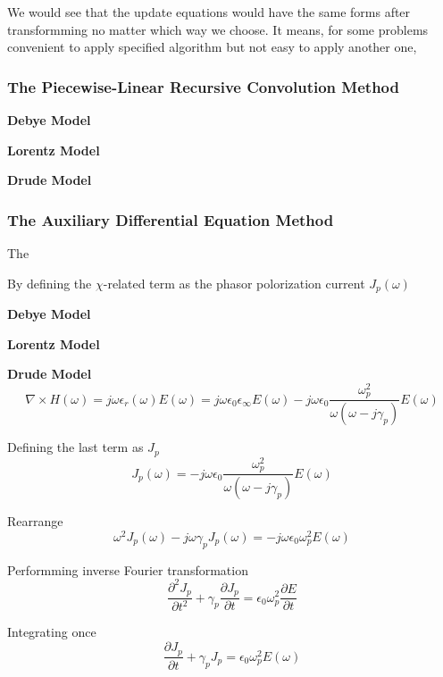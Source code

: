 We would see that the update equations would have the same forms after transformming no matter which way we choose. It
means, for some problems convenient to apply specified algorithm but not easy to apply another one, 

\subsubsection{The Piecewise-Linear Recursive Convolution Method}
\textbf{Debye Model}

\textbf{Lorentz Model}

\textbf{Drude Model}

\subsubsection{The Auxiliary Differential Equation Method}
The 

By defining the $\chi$-related term as the phasor polorization current $J_p(\omega)$

\textbf{Debye Model}

\textbf{Lorentz Model}

\textbf{Drude Model}
\begin{displaymath}
    \nabla \times H(\omega) = j\omega \epsilon_r(\omega)E(\omega) = j\omega\epsilon_0 \epsilon_{\infty} E(\omega) - j\omega\epsilon_0\frac{\omega_p^2}{\omega(\omega-j\gamma_p)}E(\omega)
\end{displaymath}

Defining the last term as $J_p$
\begin{displaymath}
  J_p(\omega) = -j\omega\epsilon_0\frac{\omega_p^2}{\omega(\omega-j\gamma_p)}E(\omega)
\end{displaymath}

Rearrange
\begin{displaymath}
  \omega^2J_p(\omega) - j\omega\gamma_pJ_p(\omega) = -j\omega\epsilon_0\omega_p^2 E(\omega)
\end{displaymath}

Performming inverse Fourier transformation
\begin{displaymath}
  \frac{\partial^2 J_p}{\partial t^2} + \gamma_p \frac{\partial J_p}{\partial t} = \epsilon_0\omega_p^2\frac{\partial E}{\partial t}
\end{displaymath}

Integrating once
\begin{displaymath}
  \frac{\partial J_p}{\partial t} + \gamma_p J_p = \epsilon_0 \omega_p^2 E(\omega)
\end{displaymath}

